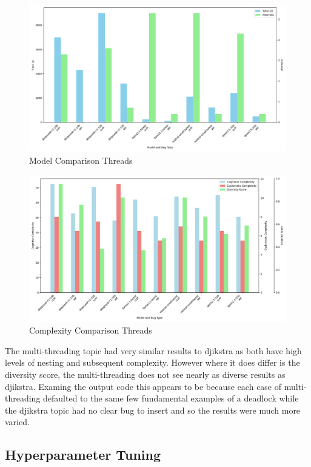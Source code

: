 \documentclass[12pt]{extarticle}
\begin{document}
\begin{figure}[h!]
\centering
\includegraphics[width=0.8\linewidth]{Images/Model_Comparison_Threads.png}
\caption{Model Comparison Threads}
\label{fig:Model_Comparison_Threads}
\end{figure}

\begin{figure}[h!]
\centering
\includegraphics[width=0.8\linewidth]{Images/Complexity_Comparison_Threads.png}
\caption{Complexity Comparison Threads}
\label{fig:Complexity_Comparison_Threads}
\end{figure}

The multi-threading topic had very similar results to djikstra as both have high levels of nesting and subsequent complexity. However where it does differ is the diversity score, the multi-threading does not see nearly as diverse results as djikstra. Examing the output code this appears to be because each case of multi-threading defaulted to the same few fundamental examples of a deadlock while the djikstra topic had no clear bug to insert and so the results were much more varied.

\subsection{Hyperparameter Tuning}
\end{document}
